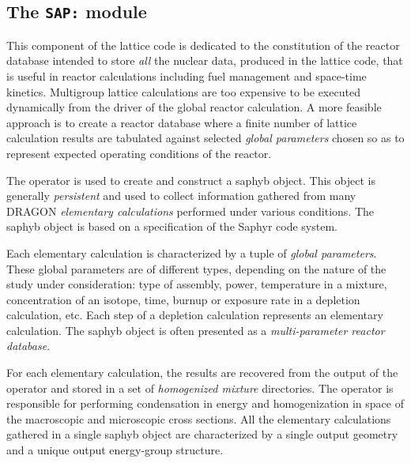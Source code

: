 \subsection{The {\tt SAP:} module}\label{sect:SAPHYBData}

This component of the lattice code is dedicated to the constitution of the
reactor database intended to store {\sl all} the nuclear data, produced in
the lattice code, that is useful
in reactor calculations including fuel management and space-time kinetics.
Multigroup lattice calculations are too expensive to be executed dynamically
from the driver of the global reactor calculation. A more feasible
approach is to create a reactor database where a finite number of lattice
calculation results are tabulated against selected {\sl global parameters}
chosen so as to represent expected operating conditions of the reactor.

\vskip 0.1cm

The  operator is used to create and construct a {\sc saphyb} object.
This object is generally {\sl persistent} and used to collect information gathered
from many DRAGON {\sl elementary calculations} performed under various conditions.
The {\sc saphyb} object is based on a specification of the Saphyr code system.\cite{Apollo2}

\vskip 0.1cm

Each elementary calculation is characterized by a tuple of {\sl global parameters}.
These global parameters are of different types, depending on the nature of the
study under consideration: type of assembly, power, temperature in a mixture,
concentration of an isotope, time, burnup or exposure rate in a depletion calculation,
etc. Each step of a depletion calculation represents an elementary calculation.
The {\sc saphyb} object is often presented as a {\sl multi-parameter reactor database}.

\vskip 0.1cm

For each elementary calculation, the results are recovered from the output of the
 operator and stored in a set of {\sl homogenized mixture}
directories. The  operator is responsible for performing condensation
in energy and homogenization in space of the macroscopic and microscopic cross
sections. All the elementary calculations gathered in a single {\sc saphyb} object are
characterized by a single output geometry and a unique output energy-group
structure.

\vskip 0.1cm


